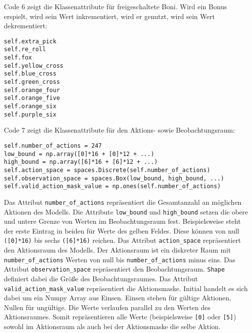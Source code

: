 \begin{minipage}{\linewidth}
Code 6 zeigt die Klassenattribute für freigeschaltete Boni. Wird ein Bonus erspielt, wird sein Wert inkrementiert, wird er genutzt, wird sein Wert dekrementiert:
\vspace{0.5cm}
\begin{lstlisting}[caption={Klassenattribute für freigespielte Boni}, basicstyle=\ttfamily]
self.extra_pick
self.re_roll
self.fox
self.yellow_cross
self.blue_cross
self.green_cross
self.orange_four
self.orange_five
self.orange_six
self.purple_six
\end{lstlisting}
\end{minipage}

\begin{minipage}{\linewidth}
Code 7 zeigt die Klassenattribute für den Aktions- sowie Beobachtungsraum:
\vspace{0.5cm}
\begin{lstlisting}[caption={Klassenattribute des Aktions- und Beobachtungsraumes}, basicstyle=\ttfamily]
self.number_of_actions = 247
low_bound = np.array([0]*16 + [0]*12 + ...)
high_bound = np.array([6]*16 + [6]*12 + ...)
self.action_space = spaces.Discrete(self.number_of_actions)
self.observation_space = spaces.Box(low_bound, high_bound, ...)
self.valid_action_mask_value = np.ones(self.number_of_actions)
\end{lstlisting}
\end{minipage}

Das Attribut \texttt{number\_of\_actions} repräsentiert die Gesamtanzahl an möglichen Aktionen des Modells. Die Attribute \texttt{low\_bound} und \texttt{high\_bound} setzen die obere und untere Grenze von Werten im Beobachtungsraum fest. Beispielsweise steht der erste Eintrag in beiden für Werte des gelben Feldes. Diese können von null \texttt{([0]*16)} bis sechs \texttt{([6]*16)} reichen. Das Attribut \texttt{action\_space} repräsentiert den Aktionsraum des Modells. Der Aktionsraum ist ein diskreter Raum mit \texttt{number\_of\_actions} Werten von null bis \texttt{number\_of\_actions} minus eins. Das Attribut \texttt{observation\_space} repräsentiert den Beobachtungsraum. \texttt{Shape} definiert dabei die Größe des Beobachtungsraumes. Das Attribut \texttt{valid\_action\_mask\_value} repräsentiert die Aktionsmaske. Initial handelt es sich dabei um ein Numpy Array aus Einsen. Einsen stehen für gültige Aktionen, Nullen für ungültige. Die Werte verlaufen parallel zu den Werten des Aktionsraumes. Somit repräsentieren alle Werte (beispielsweise \texttt{[0]} oder \texttt{[5]}) sowohl im Aktionsraum als auch bei der Aktionsmaske die selbe Aktion.\\

